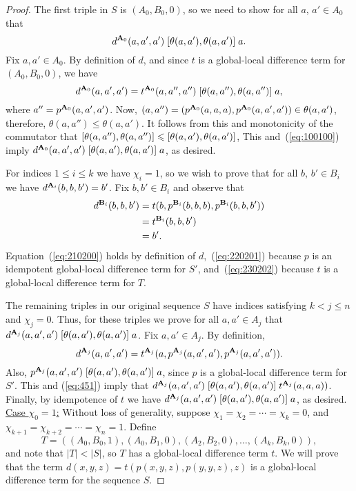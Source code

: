 \begin{proof}
The first triple in $S$ is $(A_0, B_0, 0)$, so we need to show for all $a$, $a' \in A_0$
that
\[
d^{\mathbf{A}_0}(a,a',a') \mathrel{[\theta(a,a'), \theta(a,a')]} a.
\]
Fix $a, a' \in A_0$.
By definition of $d$, and since
$t$ is a global-local difference term for $(A_0, B_0,0)$, we have
\begin{equation}
  \label{eq:100100}
  d^{\mathbf{A}_0}(a,a',a') 
  =t^{\mathbf{A}_0}(a, a'', a'')\mathrel{[\theta(a, a''), \theta(a, a'')]} a,
\end{equation}
where $a'' = p^{\mathbf{A}_0}(a,a',a')$.
Now,
$(a, a'') = (p^{\mathbf{A}_0}(a,a,a), p^{\mathbf{A}_0}(a,a',a')) \in \theta(a, a')$, therefore,
$\theta(a, a'') \leq \theta(a,a')$.
It follows from this and monotonicity of the commutator that
$\mathrel{[\theta(a, a''), \theta(a, a'')]} {\leqslant} \mathrel{[\theta(a,a'), \theta(a,a')]}$,
This and~(\ref{eq:100100}) imply
$d^{\mathbf{A}_0}(a,a',a')\mathrel{[\theta(a,a'), \theta(a,a')]} a$,
as desired.

For indices $1\leq i \leq k$ we have $\chi_i =1$, so we wish to prove
that for all $b$, $b' \in B_i$ we have
$d^{\mathbf{A}_i}(b,b,b') = b'$.
Fix $b, b' \in B_i$ and observe that
\begin{align}
  d^{\mathbf{B}_i}(b,b,b') &=
  t(b, p^{\mathbf{B}_i}(b,b,b), p^{\mathbf{B}_i}(b,b,b')) \label{eq:210200}\\
  &=t^{\mathbf{B}_i}(b, b, b') \label{eq:220201}\\
  &=b'. \label{eq:230202}
\end{align}
Equation~(\ref{eq:210200}) holds by definition of $d$,~(\ref{eq:220201})
because $p$ is an idempotent global-local difference term for
$S'$, and~(\ref{eq:230202}) because $t$ is a global-local difference term for $T$.

The remaining triples in our original sequence $S$
have indices satisfying $k<j\leq n$ and $\chi_j = 0$.
Thus, for these triples we prove
for all $a, a' \in A_j$ that
$d^{\mathbf{A}_j}(a,a',a')\mathrel{[\theta(a,a'), \theta(a,a')]} a$.
Fix $a, a' \in A_j$.
By definition,
\begin{equation}
  \label{eq:451}
d^{\mathbf{A}_j}(a,a',a') =t^{\mathbf{A}_j}(a, p^{\mathbf{A}_j}(a,a',a'), p^{\mathbf{A}_j}(a,a',a')).  
\end{equation}
Also, $p^{\mathbf{A}_j}(a,a',a') \mathrel{[\theta(a,a'), \theta(a,a')]} a$,
since $p$ is a global-local difference term for $S'$.
This and (\ref{eq:451}) imply
that
$d^{\mathbf{A}_j}(a, a',a') \mathrel{[\theta(a,a'), \theta(a,a')]} t^{\mathbf{A}_j}(a,a,a))$.
Finally, by idempotence of $t$ we have
$d^{\mathbf{A}_j}(a,a',a')\mathrel{[\theta(a,a'), \theta(a,a')]} a$,
as desired.
\\[6pt]
\underline{Case $\chi_0 = 1$:}
Without loss of generality, suppose $\chi_1 = \chi_2 =\cdots =\chi_k = 0$,
and $\chi_{k+1} = \chi_{k+2} = \cdots = \chi_{n} = 1$.
Define
\[T = ((A_0, B_0, 1), (A_0, B_1, 0), (A_2, B_2, 0), \dots, (A_k, B_k, 0)),
\]
and note that $|T| < |S|$, so $T$ has a global-local difference term $t$.
We will prove that the term $d(x,y,z) = t(p(x,y,z), p(y,y,z), z)$
is a global-local difference term for the  sequence $S$.


\end{proof}
